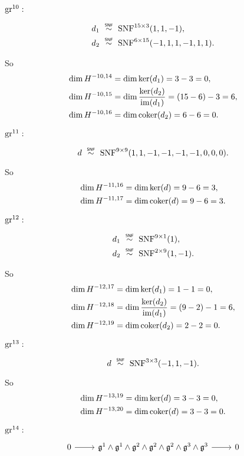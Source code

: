$\operatorname{gr}^{10}:$

\begin{align*}
  d_{1} &\snfsim \SNF^{15\times3}(1,1,-1), \\
  d_{2} &\snfsim \SNF^{6\times15}(-1,1,1,-1,1,1).
\end{align*}

So
\begin{align*}
  \dim H^{-10,14} &= \dim \operatorname{ker}(d_{1}) = 3-3 = 0, \\
  \dim H^{-10,15} &= \dim \dfrac{\operatorname{ker}(d_{2})}{\operatorname{im}(d_{1})} = (15-6) - 3 = 6, \\
  \dim H^{-10,16} &= \dim \operatorname{coker}(d_{2}) = 6-6 = 0.
\end{align*}

$\operatorname{gr}^{11}:$

\begin{equation*}
  d \snfsim \SNF^{9\times9}(1,1,-1,-1,-1,-1,0,0,0).
\end{equation*}

So
\begin{align*}
  \dim H^{-11,16} &= \dim \operatorname{ker}(d) = 9-6 = 3, \\
  \dim H^{-11,17} &= \dim \operatorname{coker}(d) = 9-6 = 3.
\end{align*}

$\operatorname{gr}^{12}:$

\begin{align*}
  d_{1} &\snfsim \SNF^{9\times1}(1), \\
  d_{2} &\snfsim \SNF^{2\times9}(1,-1).
\end{align*}

So
\begin{align*}
  \dim H^{-12,17} &= \dim \operatorname{ker}(d_{1}) = 1-1 = 0, \\
  \dim H^{-12,18} &= \dim \dfrac{\operatorname{ker}(d_{2})}{\operatorname{im}(d_{1})} = (9-2) - 1 = 6, \\
  \dim H^{-12,19} &= \dim \operatorname{coker}(d_{2}) = 2-2 = 0.
\end{align*}

$\operatorname{gr}^{13}:$

\begin{equation*}
  d \snfsim \SNF^{3\times3}(-1,1,-1).
\end{equation*}

So
\begin{align*}
  \dim H^{-13,19} &= \dim \operatorname{ker}(d) = 3-3 = 0, \\
  \dim H^{-13,20} &= \dim \operatorname{coker}(d) = 3-3 = 0.
\end{align*}

$\operatorname{gr}^{14}:$
\[
  \begin{tikzcd}
    0 \ar[r] & \lie{g}^{1} \wedge \lie{g}^{1} \wedge \lie{g}^{2} \wedge \lie{g}^{2} \wedge \lie{g}^{2} \wedge \lie{g}^{3} \wedge \lie{g}^{3}  \ar[r] & 0
  \end{tikzcd}
\]

